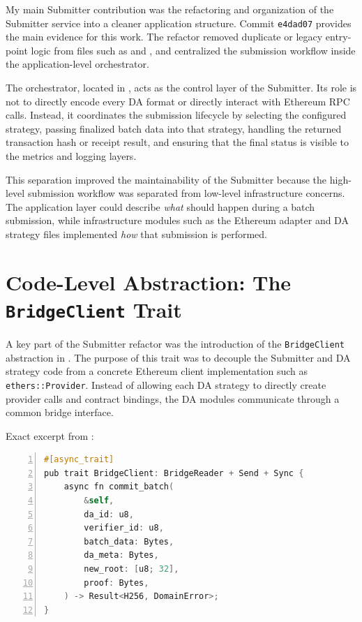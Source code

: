 My main Submitter contribution was the refactoring and organization of the Submitter service into a cleaner application structure. Commit \texttt{e4dad07} provides the main evidence for this work. The refactor removed duplicate or legacy entry-point logic from files such as  and , and centralized the submission workflow inside the application-level orchestrator.

The orchestrator, located in , acts as the control layer of the Submitter. Its role is not to directly encode every DA format or directly interact with Ethereum RPC calls. Instead, it coordinates the submission lifecycle by selecting the configured strategy, passing finalized batch data into that strategy, handling the returned transaction hash or receipt result, and ensuring that the final status is visible to the metrics and logging layers.

This separation improved the maintainability of the Submitter because the high-level submission workflow was separated from low-level infrastructure concerns. The application layer could describe \textit{what} should happen during a batch submission, while infrastructure modules such as the Ethereum adapter and DA strategy files implemented \textit{how} that submission is performed.

\section{Code-Level Abstraction: The \texttt{BridgeClient} Trait}

A key part of the Submitter refactor was the introduction of the \texttt{BridgeClient} abstraction in . The purpose of this trait was to decouple the Submitter and DA strategy code from a concrete Ethereum client implementation such as \texttt{ethers::Provider}. Instead of allowing each DA strategy to directly create provider calls and contract bindings, the DA modules communicate through a common bridge interface.

Exact excerpt from :

\newpage
\begin{lstlisting}[language=C, numbers=left, breaklines=true, basicstyle=\ttfamily\small]
#[async_trait]
pub trait BridgeClient: BridgeReader + Send + Sync {
    async fn commit_batch(
        &self,
        da_id: u8,
        verifier_id: u8,
        batch_data: Bytes,
        da_meta: Bytes,
        new_root: [u8; 32],
        proof: Bytes,
    ) -> Result<H256, DomainError>;
}
\end{lstlisting}

